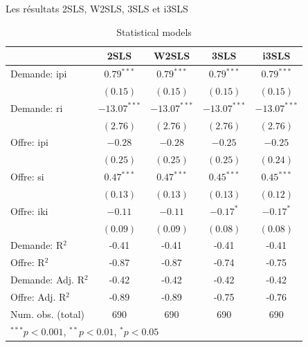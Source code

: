 \documentclass[11pt,ignorenonframetext,]{beamer}
\begin{document}
\begin{frame}{Les résultats 2SLS, W2SLS, 3SLS et i3SLS}
\protect\hypertarget{les-resultats-2sls-w2sls-3sls-et-i3sls}{}

\tiny

\begin{table}
\begin{center}
\begin{tabular}{l c c c c }
\hline
 & 2SLS & W2SLS & 3SLS & i3SLS \\
\hline
Demande: ipi        & $0.79^{***}$   & $0.79^{***}$   & $0.79^{***}$   & $0.79^{***}$   \\
                    & $(0.15)$       & $(0.15)$       & $(0.15)$       & $(0.15)$       \\
Demande: ri         & $-13.07^{***}$ & $-13.07^{***}$ & $-13.07^{***}$ & $-13.07^{***}$ \\
                    & $(2.76)$       & $(2.76)$       & $(2.76)$       & $(2.76)$       \\
Offre: ipi          & $-0.28$        & $-0.28$        & $-0.25$        & $-0.25$        \\
                    & $(0.25)$       & $(0.25)$       & $(0.25)$       & $(0.24)$       \\
Offre: si           & $0.47^{***}$   & $0.47^{***}$   & $0.45^{***}$   & $0.45^{***}$   \\
                    & $(0.13)$       & $(0.13)$       & $(0.13)$       & $(0.12)$       \\
Offre: iki          & $-0.11$        & $-0.11$        & $-0.17^{*}$    & $-0.17^{*}$    \\
                    & $(0.09)$       & $(0.09)$       & $(0.08)$       & $(0.08)$       \\
\hline
Demande: R$^2$      & -0.41          & -0.41          & -0.41          & -0.41          \\
Offre: R$^2$        & -0.87          & -0.87          & -0.74          & -0.75          \\
Demande: Adj. R$^2$ & -0.42          & -0.42          & -0.42          & -0.42          \\
Offre: Adj. R$^2$   & -0.89          & -0.89          & -0.75          & -0.76          \\
Num. obs. (total)   & 690            & 690            & 690            & 690            \\
\hline
\multicolumn{5}{l}{\scriptsize{$^{***}p<0.001$, $^{**}p<0.01$, $^*p<0.05$}}
\end{tabular}
\caption{Statistical models}
\label{table : 2sls, w2sls, 3sls and fiml}
\end{center}
\end{table}

\normalsize

\end{frame}
\end{document}
